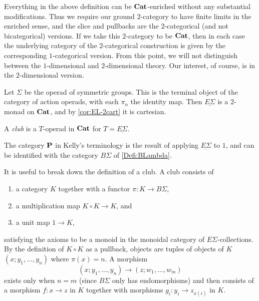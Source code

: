 \begin{rem}
Everything in the above definition can be $\mathbf{Cat}$-enriched without any substantial modifications. Thus we require our ground $2$-category to have finite limits in the enriched sense, and the slice and pullbacks are the $2$-categorical (and not bicategorical) versions. If we take this $2$-category to be $\mathbf{Cat}$, then in each case the underlying category of the $2$-categorical construction is given by the corresponding $1$-categorical version. From this point, we will not distinguish between the $1$-dimensional and $2$-dimensional theory. Our interest, of course, is in the $2$-dimensional version.
\end{rem}

Let $\Sigma$ be the operad of symmetric groups. This is the terminal object of the category of action operads, with each $\pi_{n}$ the identity map. Then $\underline{E\Sigma}$ is a $2$-monad on $\mathbf{Cat}$, and by \cref{cor:EL-2cart} it is cartesian.

\begin{Defi}
A \textit{club} is a $T$-operad in $\mathbf{Cat}$ for $T = \underline{E\Sigma}$.
\end{Defi}

\begin{rem}
The category $\mathbf{P}$ in Kelly's terminology is the result of applying $\underline{E\Sigma}$ to $1$, and can be identified with the category $B\Sigma$ of \cref{Defi:BLambda}.
\end{rem}

It is useful to break down the definition of a club. A club consists of
\begin{enumerate}
\item a category $K$ together with a functor $\pi \colon K \rightarrow B \Sigma$,
\item a multiplication map $K \circ K \rightarrow K$, and
\item a unit map $1 \rightarrow K$,
\end{enumerate}
satisfying the axioms to be a monoid in the monoidal category of $E\Sigma$-collections. By the definition of $K \circ K$ as a pullback, objects are tuples of objects of $K$ $(x; y_{1}, \ldots, y_{n})$ where $\pi(x) = n$. A morphism
  \[
    (x; y_{1}, \ldots, y_{n}) \rightarrow (z; w_{1}, \ldots, w_{m})
  \]
exists only when $n=m$ (since $B\Sigma$ only has endomorphisms) and then consists of a morphism $f \colon x \rightarrow z$ in $K$ together with morphisms $g_{i} \colon y_{i} \rightarrow z_{x(i)}$ in $K$.

